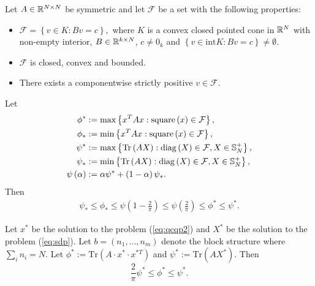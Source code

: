 \begin{theorem}\label{thm:nesterov}
Let $A \in \mathbb{R}^{N \times N}$ be symmetric and let $\mathcal{F}$ be a set with the following properties:
\begin{itemize}
\item $\mathcal{F} = \left\{ v \in K: B v = c  \right\},$ where $K$ is a convex closed pointed cone in $\mathbb{R}^N$ with non-empty interior, $B \in \mathbb{R}^{k\times N}$, $c \neq 0_k$ and $\left\{  v \in \mathrm{int}K : B v = c \right\} \neq \emptyset$.
\item $\mathcal{F}$ is closed, convex and bounded.
\item There exists a componentwise strictly positive $v \in \mathcal{F}$.

\end{itemize}
Let
\begin{align*}
\phi^* &:= \mathrm{max}\left\{  x^T A x : \mathrm{square}\left(x\right) \in \mathcal{F}  \right\},\\
\phi_* &:= \mathrm{min}\left\{  x^T A x : \mathrm{square}\left(x\right) \in \mathcal{F}  \right\},\\
\psi^* &:= \mathrm{max}\left\{  \mathrm{Tr}\left(A X\right): \mathrm{diag}\left(X\right) \in \mathcal{F}, X \in \mathbb{S}_N^+  \right\},\\
\psi_* &:= \mathrm{min}\left\{  \mathrm{Tr}\left(A X\right): \mathrm{diag}\left(X\right) \in \mathcal{F}, X \in \mathbb{S}_N^+  \right\},\\
\psi\left(\alpha\right) &:= \alpha \psi^* + \left(1-\alpha\right)\psi_*.
\end{align*}
Then
\begin{equation}\label{eq:sdpBound}
\begin{aligned}
\psi_* \leq \phi_* \leq \psi \left(1 - \frac{2}{\pi}\right) \leq \psi\left(\frac{2}{\pi}\right) \leq \phi^* \leq \psi^*.
\end{aligned}
\end{equation}

\end{theorem}



\begin{theorem}
Let
$x^{*}$ be the solution to the problem (\ref{eq:qcqp2}) and
$X^*$ be the solution to the problem (\ref{eq:sdp}).
Let $b = \left(n_1,\ldots,n_m\right)$ denote the block structure where $\sum_i n_i = N$.
Let $\phi^*:= \mathrm{Tr}\left(A \cdot x^{*} \cdot x^{*T}\right)$ and
$\psi^* := \mathrm{Tr}\left(A X^{*}\right)$.
%
Then $$\frac{2}{\pi} \psi^* \leq \phi^* \leq \psi^*.$$
\end{theorem}


